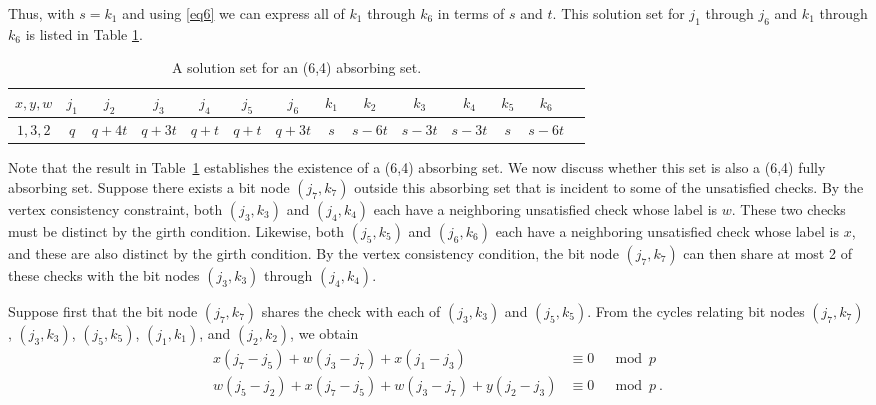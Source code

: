 Thus, with $s=k_1$ and using \eqref{eq6} we can express all of
$k_1$ through $k_6$ in terms of $s$ and $t$. This solution set for
$j_1$ through $j_6$ and $k_1$ through $k_6$ is listed in Table
\ref{table64b}.

\hspace{-0.2in}\small{\hspace{-0.2in}\begin{table}[ht]\vspace{-0.05in}\hspace{-0.2in}
\begin{tabular}{|c |c|c|c|c|c|c|c|c|c|c|c|c|c|}
  \hline
  $x,y,w$ & $j_1$ & $j_2$ & $j_3$ & $j_4$ & $j_5$ & $j_6$ & $k_1$ & $k_2$ & $k_3$ & $k_4$ & $k_5$ & $k_6$ \\
  \hline
$1,3,2$&  $q$ & $q+4t$ &  $q+3t$ &  $q+t$ &  $q+t$ & $q+3t$ & $s$ &
$s-6t$ & $s-3t$ & $s-3t$ & $s$ &
  $s-6t$\\
  \hline
\end{tabular}
\caption{ A solution set for an (6,4) absorbing
set.}\label{table64b}
\end{table}}
\normalsize

Note that the result in Table~\ref{table64b} establishes the
existence of a (6,4) absorbing set. We now discuss whether this
set is also a (6,4) fully absorbing set. Suppose there exists a
bit node $(j_7,k_7)$ outside this absorbing set that is incident
to some of the unsatisfied checks. By the vertex consistency
constraint, both $(j_3,k_3)$ and $(j_4,k_4)$ each have a
neighboring unsatisfied check whose label is $w$. These two checks
must be distinct by the girth condition. Likewise, both
$(j_5,k_5)$ and $(j_6,k_6)$ each have a neighboring unsatisfied
check whose label is $x$, and these are also distinct by the girth
condition. By the vertex consistency condition, the bit node
$(j_7,k_7)$ can then share at most 2 of these checks with the bit
nodes $(j_3,k_3)$ through $(j_4,k_4)$.

Suppose first that the bit node $(j_7,k_7)$ shares the check with
each of $(j_3,k_3)$ and $(j_5,k_5)$. From the cycles relating bit
nodes $(j_7,k_7)$, $(j_3,k_3)$, $(j_5,k_5)$, $(j_1,k_1)$, and
$(j_2,k_2)$, we obtain
\begin{eqnarray*}
x(j_7-j_5)+w(j_3-j_7)+x(j_1-j_3) &\equiv 0& \mod p\\
w(j_5-j_2)+x(j_7-j_5)+w(j_3-j_7)+y(j_2-j_3) &\equiv 0& \mod p~.
\end{eqnarray*}

